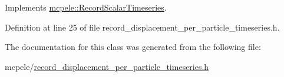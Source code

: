 \-Implements \hyperlink{classmcpele_1_1RecordScalarTimeseries_a8151f9f679c926d481e7354ac170663a}{mcpele\-::\-Record\-Scalar\-Timeseries}.



\-Definition at line 25 of file record\-\_\-displacement\-\_\-per\-\_\-particle\-\_\-timeseries.\-h.



\-The documentation for this class was generated from the following file\-:\begin{DoxyCompactItemize}
\item 
mcpele/\hyperlink{record__displacement__per__particle__timeseries_8h}{record\-\_\-displacement\-\_\-per\-\_\-particle\-\_\-timeseries.\-h}\end{DoxyCompactItemize}
